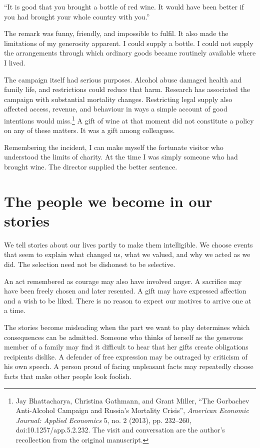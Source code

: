 \documentclass[12pt,a4paper]{book}
\begin{document}
``It is good that you brought a bottle of red wine. It would have been better if you had brought your whole country with you.''

The remark was funny, friendly, and impossible to fulfil. It also made the limitations of my generosity apparent. I could supply a bottle. I could not supply the arrangements through which ordinary goods became routinely available where I lived.

The campaign itself had serious purposes. Alcohol abuse damaged health and family life, and restrictions could reduce that harm. Research has associated the campaign with substantial mortality changes. Restricting legal supply also affected access, revenue, and behaviour in ways a simple account of good intentions would miss.\footnote{Jay Bhattacharya, Christina Gathmann, and Grant Miller, ``The Gorbachev Anti-Alcohol Campaign and Russia's Mortality Crisis'', \emph{American Economic Journal: Applied Economics} 5, no. 2 (2013), pp. 232--260, doi:10.1257/app.5.2.232. The visit and conversation are the author's recollection from the original manuscript.} A gift of wine at that moment did not constitute a policy on any of these matters. It was a gift among colleagues.

Remembering the incident, I can make myself the fortunate visitor who understood the limits of charity. At the time I was simply someone who had brought wine. The director supplied the better sentence.

\section*{The people we become in our stories}

We tell stories about our lives partly to make them intelligible. We choose events that seem to explain what changed us, what we valued, and why we acted as we did. The selection need not be dishonest to be selective.

An act remembered as courage may also have involved anger. A sacrifice may have been freely chosen and later resented. A gift may have expressed affection and a wish to be liked. There is no reason to expect our motives to arrive one at a time.

The stories become misleading when the part we want to play determines which consequences can be admitted. Someone who thinks of herself as the generous member of a family may find it difficult to hear that her gifts create obligations recipients dislike. A defender of free expression may be outraged by criticism of his own speech. A person proud of facing unpleasant facts may repeatedly choose facts that make other people look foolish.
\end{document}
